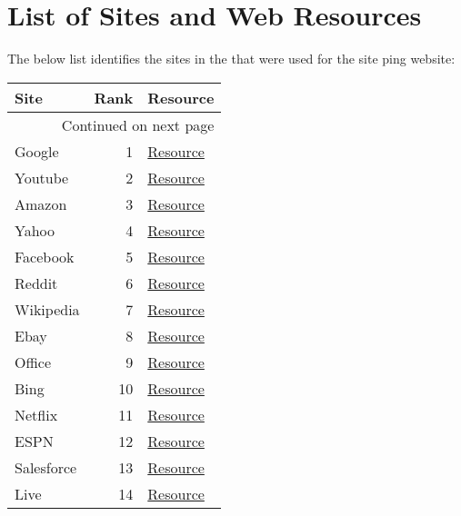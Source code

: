 \chapter{List of Sites and Web Resources}\label{sec:sites_list}

The below list identifies the sites in the \us that were used for the site ping website:

\footnotesize
\begin{longtable}{lrl}
\toprule
Site & Rank & Resource \\
\midrule
\endhead
\midrule
\multicolumn{3}{r}{{Continued on next page}} \\
\midrule
\endfoot

\bottomrule
\endlastfoot
Google        &     1 & \href{www.google.com/images/searchbox/desktop\_searchbox\_sprites302\_hr.png}{Resource} \\
Youtube       &     2 & \href{s.ytimg.com/yts/img/favicon\_32-vflOogEID.png}{Resource} \\
Amazon        &     3 & \href{www.amazon.com/empty.gif}{Resource} \\
Yahoo         &     4 & \href{s.yimg.com/os/mit/ape/m/81f43c2/t.gif}{Resource} \\
Facebook      &     5 & \href{static.xx.fbcdn.net/images/emoji.php/v9/t91/1.5/16/1f44d\_1f3fc.png}{Resource} \\
Reddit        &     6 & \href{www.redditstatic.com/desktop2x/img/renderTimingPixel.png}{Resource} \\
Wikipedia     &     7 & \href{www.wikipedia.org/static/apple-touch/wikipedia.png}{Resource} \\
Ebay          &     8 & \href{ir.ebaystatic.com/pictures/aw/pics/s\_1x2.gif}{Resource} \\
Office        &     9 & \href{a.fp.measure.office.com/apc/trans.gif}{Resource} \\
Bing          &    10 & \href{www.bing.com/favicon.ico}{Resource} \\
Netflix       &    11 & \href{help.nflxext.com/helpcenter/fc264264a231904b0fce67cd98399e10.svg}{Resource} \\
ESPN          &    12 & \href{a.espncdn.com/combiner/i?img=\%2Fi\%2Fespn\%2Fnetworks\_shows\%2F500\%2Fundefeated.png\&w=60\&h=60\&scale=crop\&cquality=80\&location=origin}{Resource} \\
Salesforce    &    13 & \href{c1.sfdcstatic.com/etc/clientlibs/sfdc-aem-master/clientlibs\_base/imgs/spacer.gif}{Resource} \\
Live          &    14 & \href{logincdn.msauth.net/16.000.28394.11/images/ellipsis\_grey.svg}{Resource} \\

\end{longtable}
